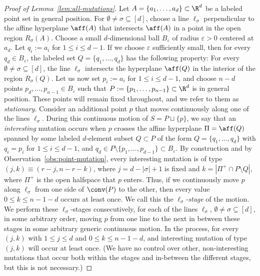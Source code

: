 \begin{proof}[Proof of Lemma~\ref{lem:all-mutations}] 
Let $A=\{a_1,\dots,a_d\} \subset \R^d$ be a labeled point set in general position. 
For $\emptyset \neq \sigma \subseteq [d]$, choose a line $\ell_\sigma$ perpendicular to the affine hyperplane $\aff(A)$ that intersects $\aff(A)$ in a point in the open region $R_\sigma(A)$. 
Choose a small $d$-dimensional ball $B_\varepsilon$ of radius $\varepsilon>0$ centered at $a_d$. Let $q_i:= a_i$ for $1\leq i\leq d-1$. If we choose $\varepsilon$ sufficiently small, then for every $q_d\in B_\varepsilon$, the labeled set 
$Q=\{q_1,\dots,q_d\}$ has the following property: For every $\emptyset \neq \sigma \subseteq [d]$, the line $\ell_\sigma$ intersects the hyperplane $\aff(Q)$ in the interior of the region $R_\sigma(Q)$.  
%
Let us now set $p_i:=a_i$ for $1\leq i \leq d-1$, and choose 
$n-d$ points $p_d,\dots,p_{n-1} \in B_{\varepsilon}$ such that $P:=\{p_1,\dots,p_{n-1}\} \subset \R^d$ is in general position. These points will remain fixed throughout, and we refer to them as \emph{stationary}. 
%
Consider an additional point $p$ that moves continuously along one of the lines $\ell_\sigma$. During this continuous motion of $S=P\sqcup\{p\}$, we say that an \emph{interesting} mutation occurs when $p$ crosses the affine hyperplane $\Pi=\aff(Q)$ spanned by some labeled $d$-element subset $Q\subset P$ of the form $Q=\{q_1,\dots,q_d\}$ with $q_i=p_i$ for $1\leq i\leq d-1$, and $q_d\in P\setminus \{p_1,\dots, p_{d-1}\} \subset B_{\varepsilon}$. By construction and by Observation~\ref{obs:point-mutation}, every interesting mutation is of type $(j,k)\equiv (r-j,n-r-k)$, where $j=d-|\sigma|+1$ is fixed and $k=|\Pi^+ \cap P\setminus Q|$, where $\Pi^+$ is the open halfspace that $p$ enters. Thus, if we continuously move  $p$ along $\ell_\sigma$ from one side of $\conv(P)$ to the other, then every value $0\leq k \leq n-1-d$ occurs at least once. We call this the \emph{$\ell_\sigma$-stage} of the motion. We perform these $\ell_\sigma$-stages consecutively, for each of the lines $\ell_\sigma$, $\emptyset \neq \sigma \subseteq [d]$, in some arbitrary order, moving $p$ from one line to the next in between these stages in some arbitrary generic continuous motion. In the process, for every $(j,k)$ with $1\leq j \leq d$ and $0\leq k \leq n-1-d$, and interesting mutation of type $(j,k)$ will occur at least once. (We have no control over other, non-interesting mutations that occur both within the stages and in-between the different stages, but this is not necessary.)
\end{proof}
%
%
%
\appendix

